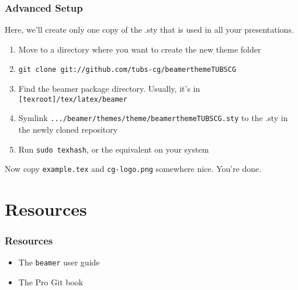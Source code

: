 \documentclass{beamer}
\begin{document}
\begin{frame}
    \frametitle{Advanced Setup}

    Here, we'll create only one copy of the .sty that is used in all your presentations.

    \begin{enumerate}
        \item Move to a directory where you want to create the new theme folder
        \item \footnotesize \texttt{git clone git://github.com/tubs-cg/beamerthemeTUBSCG} \normalsize
        \item Find the beamer package directory. Usually, it's in \texttt{[texroot]/tex/latex/beamer}
        \item Symlink \texttt{.../beamer/themes/theme/beamerthemeTUBSCG.sty} to the .sty in the newly cloned repository
        \item Run \texttt{sudo texhash}, or the equivalent on your system
    \end{enumerate}

    Now copy \texttt{example.tex} and \texttt{cg-logo.png} somewhere nice. You're done.
\end{frame}

\section{Resources}

\begin{frame}
    \frametitle{Resources}

    \begin{itemize}
        \item The \texttt{beamer} user guide \href{http://www.ctan.org/tex-archive/macros/latex/contrib/beamer/doc/beameruserguide.pdf}{}
        \item The Pro Git book \href{http://git-scm.com/book}{}
    \end{itemize}
\end{frame}
\end{document}
